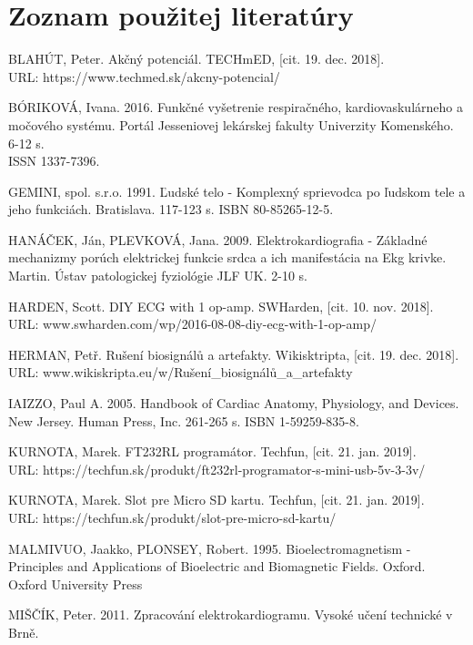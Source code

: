 \documentclass[titlepage,12pt]{article}
\begin{document}
\section{Zoznam použitej literatúry}
\begin{enumerate}[label={[\arabic*]}]

\item BLAHÚT, Peter. Akčný potenciál. TECHmED, [cit. 19. dec. 2018]. \\ 
URL: https://www.techmed.sk/akcny-potencial/
\item BÓRIKOVÁ, Ivana. 2016. Funkčné vyšetrenie respiračného, kardiovaskulárneho a \\močového systému. Portál Jesseniovej lekárskej fakulty Univerzity Komenského. 6-12 s. \\ISSN 1337-7396.
\item GEMINI, spol. s.r.o. 1991. Ľudské telo - Komplexný sprievodca po ľudskom tele a jeho funkciách. Bratislava. 117-123 s. ISBN 80-85265-12-5.
\item HANÁČEK, Ján, PLEVKOVÁ, Jana. 2009. Elektrokardiografia - Základné mechanizmy porúch elektrickej funkcie srdca a ich manifestácia na Ekg krivke. Martin. Ústav patologickej fyziológie JLF UK. 2-10 s.
\item HARDEN, Scott. DIY ECG with 1 op-amp. SWHarden, [cit. 10. nov. 2018]. \\ URL: www.swharden.com/wp/2016-08-08-diy-ecg-with-1-op-amp/
\item HERMAN, Petř. Rušení biosignálů a artefakty. Wikisktripta,  [cit. 19. dec. 2018]. \\ URL: www.wikiskripta.eu/w/Rušení\_biosignálů\_a\_artefakty
\item IAIZZO, Paul A. 2005. Handbook of Cardiac Anatomy, Physiology, and Devices. \\New Jersey. Human Press, Inc. 261-265 s. ISBN 1-59259-835-8.
\item KURNOTA, Marek. FT232RL programátor. Techfun, [cit. 21. jan. 2019]. \\ URL: https://techfun.sk/produkt/ft232rl-programator-s-mini-usb-5v-3-3v/
\item KURNOTA, Marek. Slot pre Micro SD kartu. Techfun, [cit. 21. jan. 2019]. \\ URL: https://techfun.sk/produkt/slot-pre-micro-sd-kartu/
\item MALMIVUO, Jaakko, PLONSEY, Robert. 1995. Bioelectromagnetism - Principles and Applications of Bioelectric and Biomagnetic Fields. Oxford. Oxford University Press
\item MIŠČÍK, Peter. 2011. Zpracování elektrokardiogramu. Vysoké učení technické v Brně. 

\end{enumerate}
\end{document}
